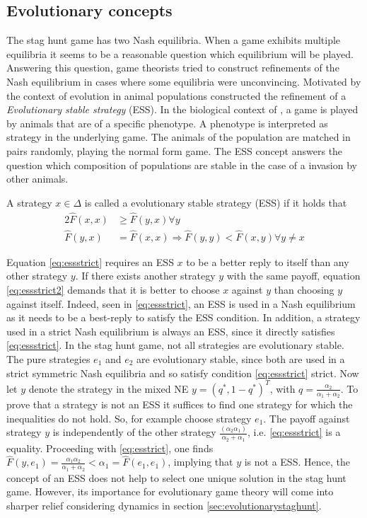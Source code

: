 \subsection{Evolutionary concepts}
The stag hunt game has two Nash equilibria. When a game exhibits 
multiple equilibria it seems to be a reasonable question 
which equilibrium will be played. Answering this question, 
game theorists tried to construct refinements 
of the Nash equilibrium in cases where some equilibria were unconvincing. 
Motivated by the context of evolution in animal populations 
\textcite{smith_lhe_1973} constructed the refinement of a 
\textit{Evolutionary stable strategy} (ESS).  
In the biological context of \textcite{smith_lhe_1973}, a game is played 
by animals that are of a specific phenotype. A phenotype is interpreted
as strategy in the underlying game. The animals of the population are matched
in pairs randomly, playing the normal form game. 
The ESS concept answers the question which composition of populations are
stable in the case of a invasion by other animals.
\begin{mydef}
        \label{def:ess}
        A strategy $x \in \Delta$ is called a evolutionary stable strategy 
        (ESS) if it holds that
        \begin{alignat}{2}
                \label{eq:essstrict}
                \hat{F}(x,x) &\geq \hat{F}(y,x) \forall y \\ 
                \hat{F}(y,x) &= \hat{F}(x,x) \Rightarrow  
                \hat{F}(y,y) < \hat{F}(x,y) \forall y \neq x \label{eq:essstrict2}
        \end{alignat}
\end{mydef}
Equation \eqref{eq:essstrict}
requires an ESS $x$ to be a better reply to itself than any other strategy $y$.
If there exists another strategy $y$ with the same payoff, equation 
\eqref{eq:essstrict2} demands that it is better to choose $x$ against $y$ than
choosing $y$ against itself.
Indeed, seen in \eqref{eq:essstrict}, an ESS is used in a Nash equilibrium as 
it needs to be a best-reply to satisfy the ESS condition. In addition, 
a strategy used in a strict Nash equilibrium is always an ESS, 
since it directly satisfies 
\eqref{eq:essstrict}. 
In the stag hunt game, not all strategies are evolutionary stable.
The pure strategies $e_1$ and $e_2$ are evolutionary stable,
since both are used in a strict symmetric Nash equilibria and so 
satisfy condition \eqref{eq:essstrict} strict. 
Now let $y$ denote the strategy in the mixed NE $y=(q^*,1-q^*)^T$, 
with $q=\frac{\alpha_2}{\alpha_1+\alpha_2}$.
To prove that a strategy is not an ESS it suffices to find one
strategy for which the inequalities do not hold.
So, for example choose strategy $e_1$.
The payoff against strategy $y$ is independently of the other strategy 
$\frac{(\alpha_2 \alpha_1)}{\alpha_2+\alpha_1}$, i.e. 
\eqref{eq:essstrict} is a equality.
Proceeding with \eqref{eq:esstrict}, one finds
$\hat{F}(y,e_1) = \frac{\alpha_1 \alpha_2}{\alpha_1+\alpha_2}
< \alpha_1 = \hat{F}(e_1,e_1)$, implying that $y$ is not a ESS.
Hence, the concept of an ESS does not help to select one 
unique solution in the stag hunt game. However, its importance for
evolutionary game theory will come into sharper relief considering
dynamics in section \ref{sec:evolutionarystaghunt}. 


